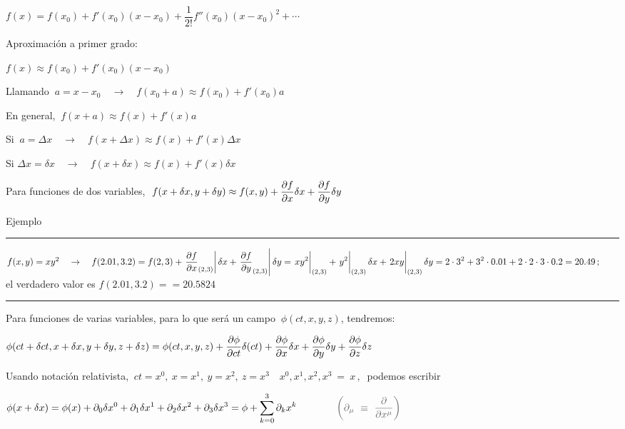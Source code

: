 $f(x)=f(x_0)+f'(x_0)(x-x_0)+\dfrac 1{2!} f''(x_0) (x-x_0)^2 + \cdots$

\begin{adjustwidth}{30pt}{10pt}
	
Aproximación a primer grado:

$f(x)\approx f(x_0)+f'(x_0)(x-x_0)$

Llamando $\ a=x-x_0 \quad \to \quad f(x_0+a)\approx f(x_0)+f'(x_0)a$

En general, $\ f(x+a)\approx f(x)+f'(x)a$

Si $\ a=\Delta x \quad \to \quad f(x+\Delta x)\approx f(x)+f'(x)\Delta x$

Si $\Delta x=\delta x \quad  \to \quad f(x+\delta x)\approx f(x)+f'(x)\delta x$
\end{adjustwidth}

\vspace{5mm}
Para funciones de dos variables, $\ \displaystyle f(x+\delta x,y+\delta y)\approx f(x,y)+ \pdv{f}{x} \delta x + \pdv{f}{y} \delta y$

\begin{small}
Ejemplo $\quad$ \rule{200pt}{0.1pt}

\textcolor{gris}{
$f(x,y)=xy^2  \quad \to \quad \displaystyle f(2.01,3.2)=f(2,3)+ \eval{\pdv{f}{x}_{(2,3)}} \delta x + \eval{\pdv{f}{y}_{(2,3)}} \delta y=\eval{xy^2}_{(2,3)}+ \eval{y^2}_{(2,3)} \delta x +\eval{2xy}_{(2,3)} \delta y =2\cdot 3^2 + 3^2 \cdot 0.01 + 2\cdot 2 \cdot 3 \cdot 0.2=20.49 \, ; \qquad$ el verdadero valor es $f(2.01,3.2)==20.5824$}
\vspace{-5mm}
\begin{flushright}\rule{250pt}{0.1pt}\end{flushright}
\end{small}

\vspace{5mm}
Para funciones de varias variables, para lo que será un campo $\ \phi(ct,x,y,z)$, tendremos:

$\displaystyle \phi(ct+\delta ct,x+\delta x,y+\delta y,z+\delta z) = \phi(ct,x,y,z)+ \pdv{\phi}{ct} \delta(ct) + \pdv{\phi}{x} \delta x + \pdv{\phi}{y} \delta y + \pdv{\phi}{z} \delta z$

Usando notación relativista, $\  ct=x^0,\ x=x^1,\ y=x^2,\ z=x^3 \quad x^0,x^1,x^2,x^3 \ = \ x\, , \ $ podemos escribir

$\displaystyle \phi(x+\delta x)=\phi(x)+\partial_0 \delta x^0 +\partial_1 \delta x^1 +\partial_2 \delta x^2 +\partial_3 \delta x^3=\phi + \sum_{k=0}^3 \partial_k x^k \qquad \qquad \textcolor{gris}{ \left( \partial_\mu \ \equiv \ \pdv{x^\mu} \right) }$

